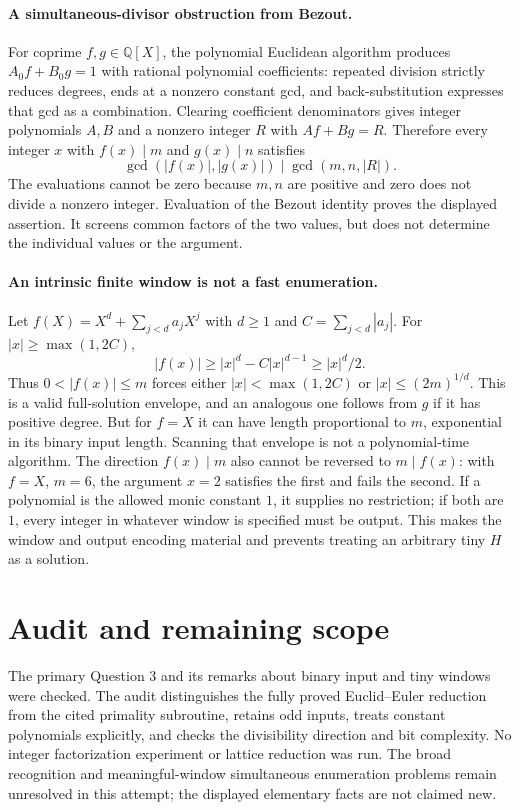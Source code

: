 \documentclass[11pt]{article}
\begin{document}
\paragraph{A simultaneous-divisor obstruction from Bezout.}
For coprime $f,g\in\mathbb Q[X]$, the polynomial Euclidean algorithm
produces $A_0f+B_0g=1$ with rational polynomial coefficients: repeated
division strictly reduces degrees, ends at a nonzero constant gcd, and
back-substitution expresses that gcd as a combination. Clearing
coefficient denominators gives integer polynomials $A,B$ and a nonzero
integer $R$ with $Af+Bg=R$. Therefore every integer $x$ with
$f(x)\mid m$ and $g(x)\mid n$ satisfies
\[
\gcd(|f(x)|,|g(x)|)\mid\gcd(m,n,|R|).
\]
The evaluations cannot be zero because $m,n$ are positive and zero
does not divide a nonzero integer. Evaluation of the Bezout identity
proves the displayed assertion. It screens common factors of the two
values, but does not determine the individual values or the argument.

\paragraph{An intrinsic finite window is not a fast enumeration.}
Let $f(X)=X^d+\sum_{j<d}a_jX^j$ with $d\ge1$ and
$C=\sum_{j<d}|a_j|$. For $|x|\ge\max(1,2C)$,
\[
|f(x)|\ge |x|^d-C|x|^{d-1}\ge |x|^d/2.
\]
Thus $0<|f(x)|\le m$ forces either $|x|<\max(1,2C)$ or
$|x|\le(2m)^{1/d}$. This is a valid full-solution envelope, and an
analogous one follows from $g$ if it has positive degree. But for
$f=X$ it can have length proportional to $m$, exponential in its
binary input length. Scanning that envelope is not a polynomial-time
algorithm. The direction $f(x)\mid m$ also cannot be reversed to
$m\mid f(x)$: with $f=X$, $m=6$, the argument $x=2$ satisfies the
first and fails the second.
If a polynomial is the allowed monic constant $1$, it supplies no
restriction; if both are $1$, every integer in whatever window is
specified must be output. This makes the window and output encoding
material and prevents treating an arbitrary tiny $H$ as a solution.

\section{Audit and remaining scope}
The primary Question 3 and its remarks about binary input and tiny
windows were checked. The audit distinguishes the fully proved
Euclid--Euler reduction from the cited primality subroutine, retains
odd inputs, treats constant polynomials explicitly, and checks the
divisibility direction and bit complexity. No integer factorization
experiment or lattice reduction was run. The broad recognition and
meaningful-window simultaneous enumeration problems remain unresolved
in this attempt; the displayed elementary facts are not claimed new.
\end{document}
